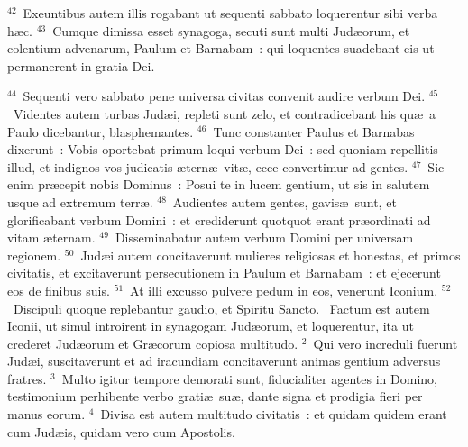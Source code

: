 ${}^{42}$~Exeuntibus autem illis rogabant ut sequenti sabbato loquerentur sibi verba h\ae c.
${}^{43}$~Cumque dimissa esset synagoga, secuti sunt multi Jud\ae orum, et colentium advenarum, Paulum et Barnabam~: qui loquentes suadebant eis ut permanerent in gratia Dei.


${}^{44}$~Sequenti vero sabbato pene universa civitas convenit audire verbum Dei.
${}^{45}$~Videntes autem turbas Jud\ae i, repleti sunt zelo, et contradicebant his qu\ae\ a Paulo dicebantur, blasphemantes.
${}^{46}$~Tunc constanter Paulus et Barnabas dixerunt~: Vobis oportebat primum loqui verbum Dei~: sed quoniam repellitis illud, et indignos vos judicatis \ae tern\ae\ vit\ae , ecce convertimur ad gentes.
${}^{47}$~Sic enim pr\ae cepit nobis Dominus~: Posui te in lucem gentium, ut sis in salutem usque ad extremum terr\ae .
${}^{48}$~Audientes autem gentes, gavis\ae\ sunt, et glorificabant verbum Domini~: et crediderunt quotquot erant pr\ae ordinati ad vitam \ae ternam.
${}^{49}$~Disseminabatur autem verbum Domini per universam regionem.
${}^{50}$~Jud\ae i autem concitaverunt mulieres religiosas et honestas, et primos civitatis, et excitaverunt persecutionem in Paulum et Barnabam~: et ejecerunt eos de finibus suis.
${}^{51}$~At illi excusso pulvere pedum in eos, venerunt Iconium.
${}^{52}$~Discipuli quoque replebantur gaudio, et Spiritu Sancto.
~\lettrine[lines=10,image=true,loversize=0.05,lraise=-0.03]{F}{}actum est autem Iconii, ut simul introirent in synagogam Jud\ae orum, et loquerentur, ita ut crederet Jud\ae orum et Gr\ae corum copiosa multitudo.
${}^{2}$~Qui vero increduli fuerunt Jud\ae i, suscitaverunt et ad iracundiam concitaverunt animas gentium adversus fratres.
${}^{3}$~Multo igitur tempore demorati sunt, fiducialiter agentes in Domino, testimonium perhibente verbo grati\ae\ su\ae , dante signa et prodigia fieri per manus eorum.
${}^{4}$~Divisa est autem multitudo civitatis~: et quidam quidem erant cum Jud\ae is, quidam vero cum Apostolis.


